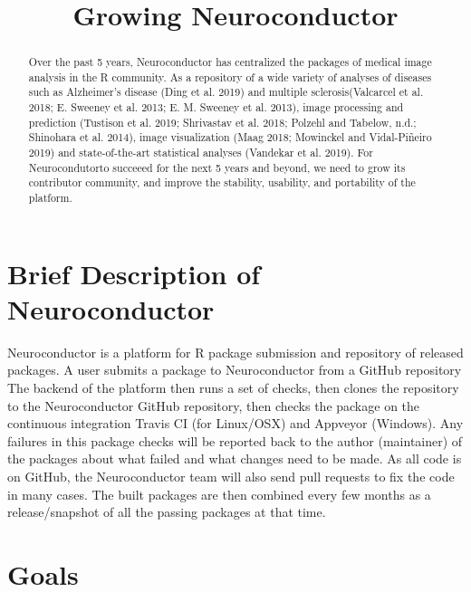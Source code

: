 \documentclass[]{elsarticle} %
\begin{document}
\begin{frontmatter}

  \title{Growing Neuroconductor}
      
  \begin{abstract}
  Over the past 5 years, Neuroconductor has centralized the packages of medical image analysis in the R community. As a repository of a wide variety of analyses of diseases such as Alzheimer's disease (Ding et al. 2019) and multiple sclerosis(Valcarcel et al. 2018; E. Sweeney et al. 2013; E. M. Sweeney et al. 2013), image processing and prediction (Tustison et al. 2019; Shrivastav et al. 2018; Polzehl and Tabelow, n.d.; Shinohara et al. 2014), image visualization (Maag 2018; Mowinckel and Vidal-Piñeiro 2019) and state-of-the-art statistical analyses (Vandekar et al. 2019). For Neurocondutorto succeeed for the next 5 years and beyond, we need to grow its contributor community, and improve the stability, usability, and portability of the platform.
  \end{abstract}
  
 \end{frontmatter}

\hypertarget{brief-description-of-neuroconductor}{%
\section{Brief Description of Neuroconductor}\label{brief-description-of-neuroconductor}}

Neuroconductor is a platform for R package submission and repository of released packages. A user submits a package to Neuroconductor from a GitHub repository The backend of the platform then runs a set of checks, then clones the repository to the Neuroconductor GitHub repository, then checks the package on the continuous integration Travis CI (for Linux/OSX) and Appveyor (Windows). Any failures in this package checks will be reported back to the author (maintainer) of the packages about what failed and what changes need to be made. As all code is on GitHub, the Neuroconductor team will also send pull requests to fix the code in many cases. The built packages are then combined every few months as a release/snapshot of all the passing packages at that time.

\hypertarget{goals}{%
\section{Goals}\label{goals}}
\end{document}
